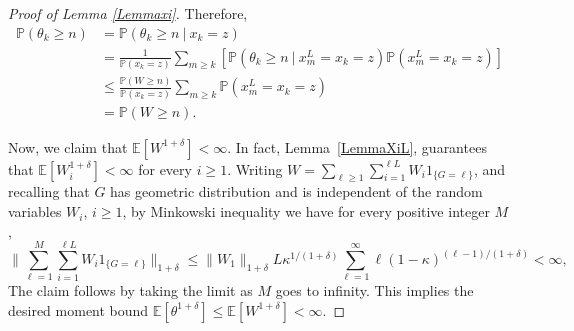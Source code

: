 \documentclass[a4paper,oneside,12pt]{amsart}
\renewcommand{\leq}{\leqslant}
\renewcommand{\geq}{\geqslant}
\newcommand{\E}{\mathbb{E}}
\theoremstyle{plain}
\theoremstyle{definition}
\theoremstyle{remark}
\renewcommand{\P}{\mathbb{P}}
\begin{document}
\begin{proof}[Proof of Lemma \ref{Lemmaxi}]
Therefore,
\begin{align*}
\P(\theta_k \geq n) &= \P\left(\theta_k \geq n ~\vert~  x_k = z\right) \\
&= \frac{1}{\P(x_k = z)}\sum_{m \geq k} \left[ \P\left(\theta_k \geq n ~\vert~ x_m^L = x_k = z\right)\P\left( x_m^L = x_k = z \right)\right] \\
&\leq \frac{\P(W \geq n)}{\P(x_k = z)}\sum_{m \geq k}\P\left( x_m^L = x_k = z \right) \\ 
&= \P(W \geq n).
\end{align*}

Now, we claim that $\E[W^{1+\delta}] < \infty$. 
In fact, Lemma~\ref{LemmaXiL}, guarantees that $\E[W_i^{1+\delta}] < \infty$ for every $i \geq 1$.
Writing $W = \sum_{\ell \geq 1} \sum_{i = 1}^{\ell L} W_i 1_{\{G=\ell\}}$, and recalling that $G$ has geometric distribution and is independent of the random variables $W_i$, $i \geq 1$, by Minkowski inequality we have for every positive integer $M$,
\begin{equation}\label{Minkowski}
\Big\lVert \sum_{\ell = 1}^M \sum_{i=1}^{\ell L} W_i 1_{{\{G=\ell}\}}\Big\rVert_{1+\delta} \leq \big\lVert W_1\big\rVert_{1+\delta} L \kappa^{1/(1+\delta)} \sum_{\ell=1}^{\infty} \ell  (1-\kappa)^{(\ell-1)/(1+\delta)} < \infty,
\end{equation}
The claim follows by taking the limit as $M$ goes to infinity.
This implies the desired moment bound $\E[\theta^{1+\delta}] \leq \E[W^{1+\delta}] < \infty$.
\end{proof}
\end{document}
